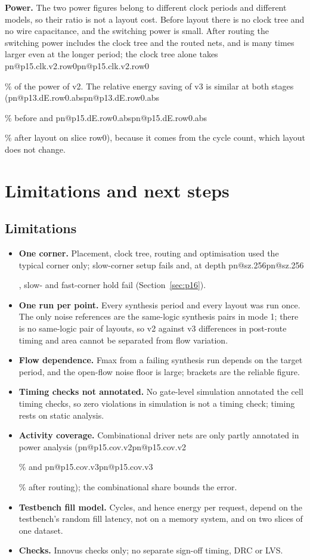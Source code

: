 \documentclass[11pt,a4paper]{article}
\makeatletter
\DeclareRobustCommand{\R}[1]{\ifcsname pn@#1\endcsname\csname pn@#1\endcsname\else
  \PackageError{synthesis report}{number key '#1' is not defined in macros.tex}{Run tools/make_paper_macros.py --target synth}\fi}
\makeatother
\begin{document}
\textbf{Power.} The two power figures belong to different clock periods and different models, so their ratio is not
a layout cost. Before layout there is no clock tree and no wire capacitance, and the switching power is small. After
routing the switching power includes the clock tree and the routed nets, and is many times larger even at the longer
period; the clock tree alone takes \R{p15.clk.v2.row0}\% of the power of v2. The relative energy saving of v3 is
similar at both stages (\R{p13.dE.row0.abs}\% before and \R{p15.dE.row0.abs}\% after layout on slice row0), because
it comes from the cycle count, which layout does not change.

\section{Limitations and next steps}\label{sec:limits}
\subsection{Limitations}
\begin{itemize}
\item \textbf{One corner.} Placement, clock tree, routing and optimisation used the typical corner only; slow-corner
setup fails and, at depth \R{sz.256}, slow- and fast-corner hold fail (Section~\ref{sec:p16}).
\item \textbf{One run per point.} Every synthesis period and every layout was run once. The only noise references
are the same-logic synthesis pairs in mode 1; there is no same-logic pair of layouts, so v2 against v3 differences in
post-route timing and area cannot be separated from flow variation.
\item \textbf{Flow dependence.} Fmax from a failing synthesis run depends on the target period, and the open-flow
noise floor is large; brackets are the reliable figure.
\item \textbf{Timing checks not annotated.} No gate-level simulation annotated the cell timing checks, so zero
violations in simulation is not a timing check; timing rests on static analysis.
\item \textbf{Activity coverage.} Combinational driver nets are only partly annotated in power analysis
(\R{p15.cov.v2}\% and \R{p15.cov.v3}\% after routing); the combinational share bounds the error.
\item \textbf{Testbench fill model.} Cycles, and hence energy per request, depend on the testbench's random fill
latency, not on a memory system, and on two slices of one dataset.
\item \textbf{Checks.} Innovus checks only; no separate sign-off timing, DRC or LVS.
\end{itemize}
\end{document}
